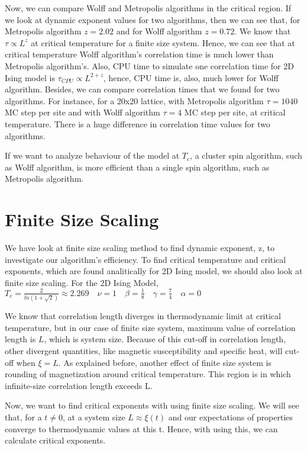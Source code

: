 \documentclass[12pt,fleqn]{report}
\begin{document}
Now, we can compare Wolff and Metropolis algorithms in the critical 
region. If we look at dynamic exponent values for two algorithms, then we 
can see that, for Metropolis algorithm $z=2.02$ and for Wolff algorithm 
$z=0.72$. We know that $\tau \propto L^{z}$ at critical temperature for a 
finite size system. Hence, we can see that at critical temperature Wolff 
algorithm's correlation time is much lower than Metropolis algorithm's. 
Also, CPU time to simulate one correlation time for 2D Ising model is 
$\tau_{CPU} \propto L^{2+z} $, hence, CPU time is, also, much lower for 
Wolff algorithm. Besides, we can compare correlation times that we found 
for two algorithms. For instance, for a 20x20 lattice, with Metropolis 
algorithm $\tau=1040 $ MC step per site and with Wolff algorithm $\tau= 
4 $ MC step per site, at critical temperature. There is a huge difference in 
correlation time values for two algorithms. 

If we want to analyze behaviour of the model at $T_c$, a cluster spin 
algorithm, such as Wolff algorithm, is more efficient than a single spin 
algorithm, such as Metropolis algorithm. 



\chapter{Finite Size Scaling}

We have look at finite size scaling method to find dynamic exponent, z, to 
investigate our algorithm's efficiency. To find critical temperature and 
critical exponents, which are found analitically for 2D Ising model,  we 
should also look at finite size scaling. For the 2D Ising Model, $T_c = 
\frac{2}{ln(1+ \sqrt{2})} \approx 2.269 \quad \nu = 1 \quad \beta = 
\frac{1}{8} \quad
\gamma= \frac{7}{4} \quad \alpha=0$

We know that correlation length diverges in thermodynamic limit at critical 
temperature, but in 
our case of finite size system, maximum value of correlation length is 
$L$, which is system size. Because of this cut-off in correlation length, 
other divergent quantities, like magnetic susceptibility and specific heat, 
will cut-off when $\xi = L$. As explained before, another effect of finite 
size system is rounding of magnetization around critical temperature. This 
region is in which infinite-size correlation length exceeds L.\cite{sandvik}

Now, we want to find critical exponents with using finite size scaling. 
We will see that, for a $t \neq 0$, at a system size 
$L \approx \xi (t) $  and our expectations of properties converge to 
thermodynamic values at this t. Hence, with using this, we can calculate 
critical exponents.
\end{document}
